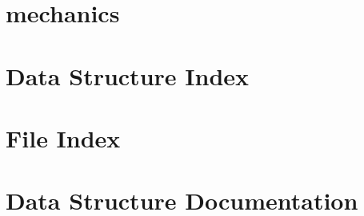 \let\mypdfximage\pdfximage\def\pdfximage{\immediate\mypdfximage}\documentclass[twoside]{book}
\newcommand{\+}{\discretionary{\mbox{\scriptsize$\hookleftarrow$}}{}{}}
\begin{document}
\chapter{mechanics}
\label{md_docs_NOTES}

\chapter{Data Structure Index}

\chapter{File Index}

\chapter{Data Structure Documentation}


\end{document}
